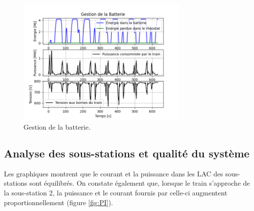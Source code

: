 \documentclass[11pt, a4paper, oneside, portrait]{report}
\begin{document}
            \begin{figure}[H]
                \centering
                \includegraphics[width=0.75\textwidth]{Figures/Bat.png}
                \caption{Gestion de la batterie.}
                \label{fig:Bat}
            \end{figure}

            \subsection*{Analyse des sous-stations et qualité du système}
            Les graphiques montrent que le courant et la puissance dans les LAC des sous-stations sont équilibrés. On constate également que, lorsque le train
            s’approche de la sous-station 2, la puissance et le courant fournis par celle-ci augmentent
            proportionnellement (figure \ref{fig:PI}).
\end{document}

